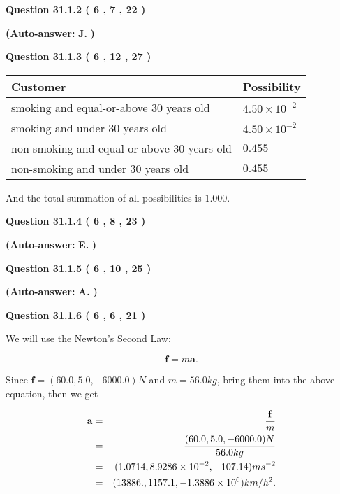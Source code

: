 \documentclass[12pt]{article}
\begin{document}
  
{\textbf{\large{Question
31.1.2 
 (           6 ,           7 ,          22 )
}}}
 
 
{\textbf{(Auto-answer:}}
{\textbf{\large{
J.}}}
{\textbf{)}}
 
 
  
  
{\textbf{\large{Question
31.1.3 
 (           6 ,          12 ,          27 )
}}}

 
\noindent
\begin{tabular}{|l|l|}
\hline
Customer & Possibility \\
\hline
smoking  and  %
equal-or-above 30 years old &
  $ %
4.50 \times 10^{-2}$ \\
\hline
smoking  and  %
under 30 years old &
  $ %
4.50 \times 10^{-2}$ \\
\hline
 non-smoking and  %
equal-or-above 30 years old &
  $ %
0.455$ \\
\hline
 non-smoking and  %
under 30 years old &
  $ %
0.455$ \\
\hline
\end{tabular}
 
\noindent
 And the total summation of all possibilities is $  %
1.000 $.
 
  
  
{\textbf{\large{Question
31.1.4 
 (           6 ,           8 ,          23 )
}}}
 
 
{\textbf{(Auto-answer:}}
{\textbf{\large{
E.}}}
{\textbf{)}}
 
 
  
  
{\textbf{\large{Question
31.1.5 
 (           6 ,          10 ,          25 )
}}}
 
 
{\textbf{(Auto-answer:}}
{\textbf{\large{
A.}}}
{\textbf{)}}
 
 
  
  
{\textbf{\large{Question
31.1.6 
 (           6 ,           6 ,          21 )
}}}

We will use the Newton's Second Law:
 
\[
\mathbf{f}=m\mathbf{a}.
\]
 
Since $\mathbf{f}=( %
60.0,  %
5.0,  %
-6000.0 )N$
and $m= %
56.0 kg$, bring them into the above equation, then we get
 
\begin{eqnarray*}
\mathbf{a}&=&\frac{\mathbf{f}}m  \\
&=&\frac{(
60.0 ,
5.0 ,
-6000.0 )N
}{ %
56.0 kg}  \\
&=&(
1.0714 ,
8.9286 \times 10^{-2},
-107.14
)ms^{-2} \\
&=&(
13886. ,
1157.1 ,
-1.3886 \times 10^{6}
)km/h^2.
\end{eqnarray*}
 
\end{document}
